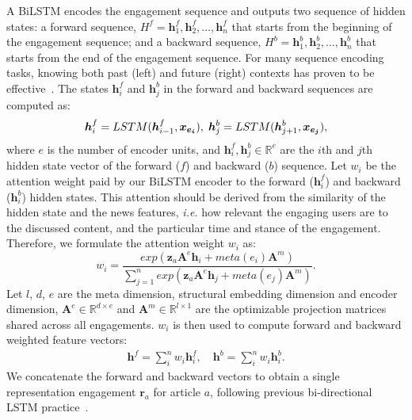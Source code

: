 \documentclass[fyp]{socreport}
\theoremstyle{definition}
\theoremstyle{hypothesis}
\begin{document}
A BiLSTM encodes the engagement sequence and outputs two sequence of hidden states: a forward sequence,
$H^f={\boldsymbol{h}^f_1, \boldsymbol{h}^f_2,\ldots,
  \boldsymbol{h}^f_n}$ that starts from the beginning of the engagement sequence; and
a backward sequence, $H^b={\boldsymbol{h}^b_1,
  \boldsymbol{h}^b_2,\ldots, \boldsymbol{h}^b_n}$ that starts from the
end of the engagement sequence. For many sequence encoding tasks, knowing both past
(left) and future (right) contexts has proven to be effective~\cite{dyer2015transition}. The states $\boldsymbol{h}^f_i$ and $\boldsymbol{h}^b_j$ in
the forward and backward sequences are computed as:
\begin{eqnarray}
  \boldsymbol{h}^f_i=LSTM(\boldsymbol{h}^f_{i-1}, \boldsymbol{x_{e_i}}),
  \hspace{1mm}\boldsymbol{h}^b_j=LSTM(\boldsymbol{h}^b_{j+1}, \boldsymbol{x_{e_j}}), \nonumber 
\end{eqnarray}
where $e$ is the number of encoder units, and $\boldsymbol{h}^f_i, \boldsymbol{h}^b_j\in \mathbb{R}^e$ are the $i$th and $j$th hidden state vector of the forward ($f$) and backward ($b$) sequence. Let $w_i$ be the attention weight paid by our BiLSTM encoder to the forward ($\boldsymbol{h}^f_i$) and backward ($\boldsymbol{h}^b_i$) hidden states. This attention should be derived from the similarity of the hidden state and the news features, \textit{i.e.} how relevant the engaging users are to the discussed content, and the particular time and stance of the engagement. Therefore, we formulate the attention weight $w_i$ as:
\begin{equation}
    w_i = \frac{exp(\boldsymbol{z}_a \mathbf{A}^e  \boldsymbol{h}_i + meta(e_i) \mathbf{A}^m)}{\sum^n_{j=1}exp(\boldsymbol{z}_a \mathbf{A}^e \boldsymbol{h}_j + meta(e_j) \mathbf{A}^m)}.
\end{equation}
Let $l$, $d$, $e$ are the meta dimension, structural embedding dimension and encoder dimension, $\mathbf{A}^e\in \mathbb{R}^{d\times e}$ and $\mathbf{A}^m\in \mathbb{R}^{l\times 1}$ are the optimizable projection matrices shared across all engagements. $w_i$ is then used to compute forward and backward weighted feature vectors:
\begin{eqnarray}\label{eq:w_sum}
  \boldsymbol{h}^f=\sum^n_i w_i \boldsymbol{h}^f_i, 
  \quad\boldsymbol{h}^b=\sum^n_i w_i \boldsymbol{h}^b_i. 
\end{eqnarray}
We concatenate the forward and backward vectors to obtain a single representation engagement $\boldsymbol{r}_a$ for article $a$, following previous bi-directional LSTM practice~\cite{ma2016end}.
\end{document}
